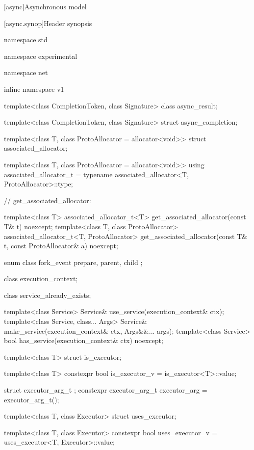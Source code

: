 
[async]{Asynchronous model}


%
[async.synop]{Header  synopsis}

%
%
%
%
\begin{codeblock}
namespace std {
namespace experimental {
namespace net {
inline namespace v1 {

  template<class CompletionToken, class Signature>
    class async_result;

  template<class CompletionToken, class Signature>
    struct async_completion;

  template<class T, class ProtoAllocator = allocator<void>>
    struct associated_allocator;

  template<class T, class ProtoAllocator = allocator<void>>
    using associated_allocator_t = typename associated_allocator<T, ProtoAllocator>::type;

  // get_associated_allocator:

  template<class T>
    associated_allocator_t<T> get_associated_allocator(const T& t) noexcept;
  template<class T, class ProtoAllocator>
    associated_allocator_t<T, ProtoAllocator>
      get_associated_allocator(const T& t, const ProtoAllocator& a) noexcept;

  enum class fork_event {
    prepare,
    parent,
    child
  };

  class execution_context;

  class service_already_exists;

  template<class Service> Service& use_service(execution_context& ctx);
  template<class Service, class... Args> Service&
    make_service(execution_context& ctx, Args&&... args);
  template<class Service> bool has_service(execution_context& ctx) noexcept;

  template<class T> struct is_executor;

  template<class T>
    constexpr bool is_executor_v = is_executor<T>::value;

  struct executor_arg_t { };
  constexpr executor_arg_t executor_arg = executor_arg_t();

  template<class T, class Executor> struct uses_executor;

  template<class T, class Executor>
    constexpr bool uses_executor_v = uses_executor<T, Executor>::value;

}}}}
\end{codeblock}
